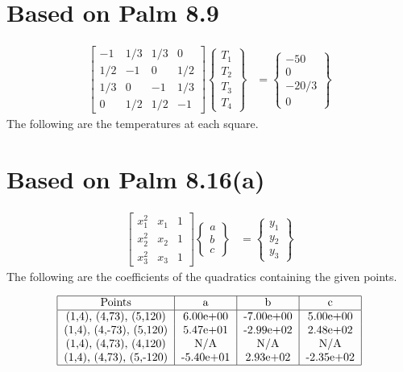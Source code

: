 \documentclass{article}
\begin{document}
\section{Based on Palm 8.9}
\renewcommand*{\arraystretch}{1}
\begin{align*}
\begin{bmatrix}
-1 & 1/3 & 1/3 & 0\\
1/2 & -1 & 0 & 1/2\\
1/3 & 0 & -1 & 1/3\\
0 & 1/2 & 1/2 & -1
\end{bmatrix}
\begin{Bmatrix}
T_1\\T_2\\T_3\\T_4
\end{Bmatrix} & =
\begin{Bmatrix}
-50\\0\\-20/3\\0
\end{Bmatrix}
\end{align*}
The following are the temperatures at each square.

\section{Based on Palm 8.16(a)}
\begin{align*}
\begin{bmatrix}
x_1^2 & x_1 & 1\\
x_2^2 & x_2 & 1\\
x_3^2 & x_3 & 1
\end{bmatrix}
\begin{Bmatrix}
a\\b\\c
\end{Bmatrix} & =
\begin{Bmatrix}
y_1\\y_2\\y_3
\end{Bmatrix}
\end{align*}
The following are the coefficients of the quadratics containing the given points.
\begin{center}
\[
\begin{tabular}{|c|c|c|c|}
\hline \mbox{Points} & a & b & c\\
\hline (1,4), (4,73), (5,120) & 6.00e+00 & -7.00e+00 & 5.00e+00\\
(1,4), (4,-73), (5,120) & 5.47e+01 & -2.99e+02 & 2.48e+02\\
(1,4), (4,73), (4,120) & N/A & N/A & N/A\\
(1,4), (4,73), (5,-120) & -5.40e+01 & 2.93e+02 & -2.35e+02\\ \hline
\end{tabular}
\]
\end{center}
\end{document}
